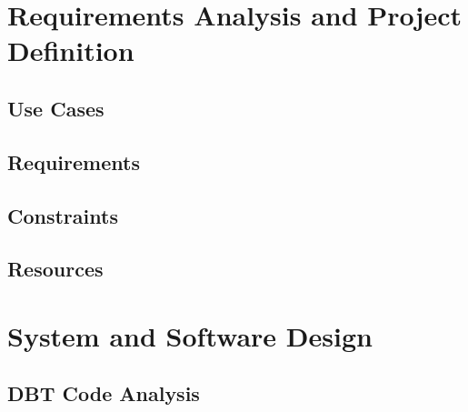 \documentclass[12pt]{article}
\begin{document}
\section{Requirements Analysis and Project Definition}


\subsection{Use Cases}


\subsection{Requirements}


\subsection{Constraints}


\subsection{Resources}

%

\newpage
\section{System and Software Design}

\subsection {DBT Code Analysis}

\end{document}
